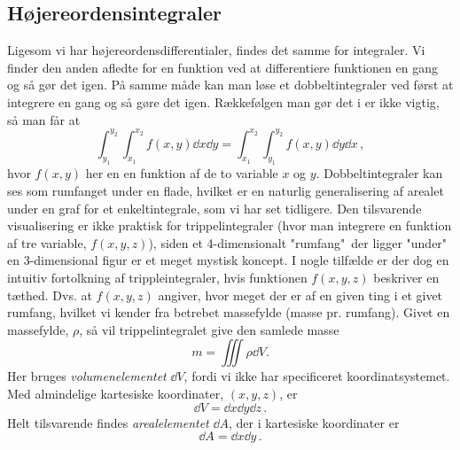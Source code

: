 \subsection{Højereordensintegraler}
Ligesom vi har højereordensdifferentialer, findes det samme for integraler.
Vi finder den anden afledte for en funktion ved at differentiere funktionen en gang og så gør det igen. På samme måde kan man løse et dobbeltintegraler ved først at integrere en gang og så gøre det igen. Rækkefølgen man gør det i er ikke vigtig, så man får at
\begin{equation}
    \int_{y_1}^{y_2}\int_{x_1}^{x_2} f(x,y) \dd{x}\dd{y}=\int_{x_1}^{x_2}\int_{y_1}^{y_2} f(x,y) \dd{y}\dd{x} \, ,
\end{equation}
hvor $f(x,y)$ her en en funktion af de to variable $x$ og $y$.
Dobbeltintegraler kan ses som rumfanget under en flade, hvilket er en naturlig generalisering af arealet under en graf for et enkeltintegrale, som vi har set tidligere.
Den tilsvarende visualisering er ikke praktisk for trippelintegraler (hvor man integrere en funktion af tre variable, $f(x,y,z)$), siden et 4-dimensionalt "rumfang"$\,$ der ligger "under"$\,$ en 3-dimensional figur er et meget mystisk koncept. 
I nogle tilfælde er der dog en intuitiv fortolkning af trippleintegraler, hvis funktionen $f(x,y,z)$ beskriver en tæthed. Dvs. at $f(x,y,z)$ angiver, hvor meget der er af en given ting i et givet rumfang, hvilket vi kender fra betrebet massefylde (masse pr. rumfang).
Givet en massefylde, $\rho$, så vil trippelintegralet give den samlede masse
\begin{equation*}
    m=\iiint \rho \dd{V}.
\end{equation*}
Her bruges \emph{volumenelementet} $\dd V$, fordi vi ikke har specificeret koordinatsystemet. Med almindelige kartesiske koordinater, $(x,y,z)$, er
\begin{equation}
    \dd{V} = \dd{x}\dd{y}\dd{z} \, .
\end{equation}
Helt tilsvarende findes {\em arealelementet} $\dd A$, der i kartesiske koordinater er
\begin{equation}
    \dd{A} = \dd{x}\dd{y} \, .
\end{equation}

